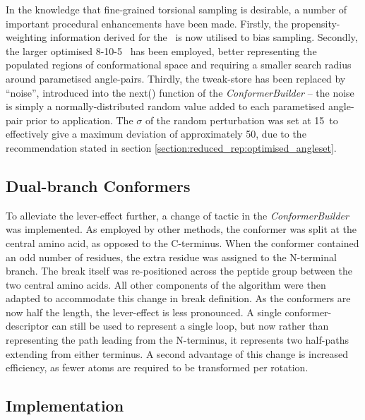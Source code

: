 In the knowledge that fine-grained torsional sampling is desirable, a number of important procedural enhancements have been made. Firstly, the propensity-weighting information derived for the \angleset\ is now utilised to bias sampling. Secondly, the larger optimised 8-10-5 \angleset\ has been employed, better representing the populated regions of conformational space and requiring a smaller search radius around parametised angle-pairs. Thirdly, the tweak-store has been replaced by ``noise'', introduced into the next() function of the \textsl{ConformerBuilder} -- the noise  is simply a normally-distributed random value added to each parametised angle-pair prior to application. The $\sigma$ of the random perturbation was set at 15\degree\ to effectively give a maximum deviation of approximately 50\degree, due to  the recommendation stated in section \ref{section:reduced_rep:optimised_angleset}.



\subsection{Dual-branch Conformers}
\label{section:arcus:dualbranch}


To alleviate the lever-effect further, a change of tactic in the \textsl{ConformerBuilder} was implemented. As employed by other methods\cite{METHOD:Plop,METHOD:CLOOP}, the conformer was split at the central amino acid, as opposed to the C-terminus. When the conformer contained an odd number of residues, the extra residue was assigned to the N-terminal branch. The break itself was re-positioned across the peptide group between the two central amino acids. All other components of the algorithm were then adapted to accommodate this change in break definition. As the conformers are now half the length, the lever-effect is less pronounced. A single conformer-descriptor can still be used to represent a single loop, but now rather than representing the path leading from the N-terminus, it represents two half-paths extending from either terminus.
A second advantage of this change is increased efficiency, as fewer atoms are required to be transformed per rotation.

\subsection{Implementation}

